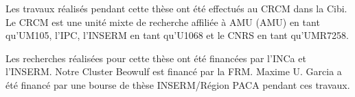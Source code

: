\thispagestyle{empty}
\noindent\textsf{Les travaux réalisés pendant cette thèse ont été effectués au \ac{CRCM} dans la \ac{Cibi}.\\Le \ac{CRCM} est une unité mixte de recherche affiliée à \acl{AMU} (\acs{AMU}) en tant qu'UM105, l'\ac{IPC}, l'\ac{INSERM} en tant qu'U1068 et le \ac{CNRS} en tant qu'UMR7258.}
\vspace{.7cm}

\begin{center}
	\def\svgwidth{12cm}
\end{center}

\vspace{.7cm}
\noindent\textsf{Les recherches réalisées pour cette thèse ont été financées par l'\ac{INCa} et l'\ac{INSERM}. Notre Cluster Beowulf est financé par la \ac{FRM}. Maxime U. Garcia a été financé par une bourse de thèse \ac{INSERM}/Région \ac{PACA} pendant ces travaux.}
